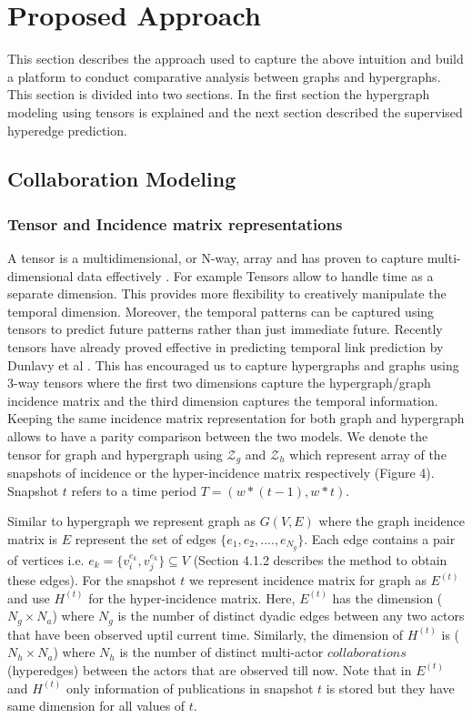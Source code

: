 \documentclass{sig-alternate}
\begin{document}
\section{Proposed Approach}

This section describes the approach used to capture the above intuition and build a platform to conduct comparative analysis between graphs and hypergraphs. This section is divided into two sections. In the first section the hypergraph modeling using tensors is explained and the next section described the supervised hyperedge prediction. 

\subsection{Collaboration Modeling}

\subsubsection{Tensor and Incidence matrix representations}

A tensor is a multidimensional, or N-way, array \cite{pearson2012spectral} and has proven to capture multi-dimensional data effectively \cite{kolda07}. For example Tensors allow to handle time as a separate dimension. This provides more flexibility to creatively manipulate the temporal dimension. Moreover, the temporal patterns can be captured using tensors to predict future patterns rather than just immediate future. Recently tensors have already proved effective in predicting temporal link prediction by Dunlavy et al \cite{kolda11}. This has encouraged us to capture hypergraphs and graphs using 3-way tensors where the first two dimensions capture the hypergraph/graph incidence matrix and the third dimension captures the temporal information. Keeping the same incidence matrix representation for both graph and hypergraph allows to have a parity comparison between the two models. 
We denote the tensor for graph and hypergraph using $\mathscr{Z}_{g}$ and $\mathscr{Z}_{h}$ which represent array of the snapshots of incidence or the hyper-incidence matrix respectively (Figure 4). Snapshot \(t\) refers to a time period \(T=(w*(t-1), w*t)\). 

Similar to hypergraph we represent graph as \(G(V,E)\) where the graph incidence matrix is \(E\) represent the set of edges $\{e_1,e_2,....,e_{N_g}\}$. Each edge contains a pair of vertices i.e. \(e_k=\{v_i^{e_k},v_j^{e_k}\} \subseteq V\) (Section 4.1.2 describes the method to obtain these edges). For the snapshot \(t\) we represent incidence matrix for graph as \(E^{(t)}\) and use \(H^{(t)}\) for the hyper-incidence matrix. Here, \(E^{(t)}\) has the dimension (\(N_{g}\times N_{a}\)) where \(N_{g}\) is the number of distinct dyadic edges between any two actors that have been observed uptil current time. Similarly, the dimension of \(H^{(t)}\) is (\(N_{h}\times N_{a}\)) where \(N_{h}\) is the number of distinct multi-actor $collaborations$ (hyperedges) between the actors that are observed till now. Note that in \(E^{(t)}\) and \(H^{(t)}\) only information of publications in snapshot $t$ is stored but they have same dimension for all values of $t$.
\end{document}
